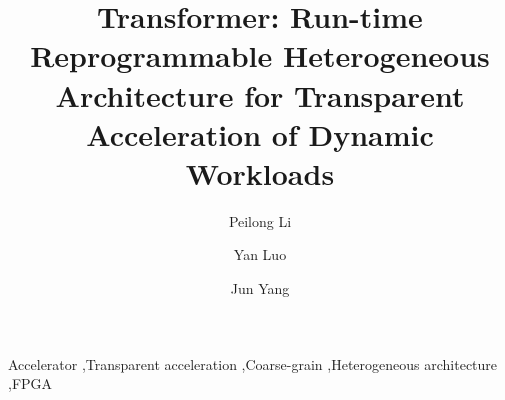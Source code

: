 \documentclass[3p,times]{elsarticle}
\begin{document}
\begin{frontmatter}

\title{Transformer: Run-time Reprogrammable Heterogeneous Architecture
  for Transparent Acceleration of Dynamic Workloads}


\author{Peilong Li}
\author{Yan Luo}
\address{University of Massachusetts Lowell, One University Ave, Lowell, MA, USA, 01854}
\author{Jun Yang}
\address{University of Pittsburgh, 4200 Fifth Avenue, Pittsburgh, PA, USA, 15260}



\begin{keyword}
Accelerator \sep Transparent acceleration \sep Coarse-grain
\sep Heterogeneous architecture \sep FPGA



\end{keyword}

\end{frontmatter}





















\end{document}
